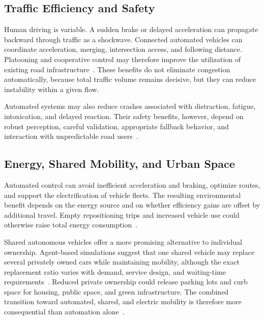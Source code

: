 \documentclass[12pt,a4paper]{article}
\begin{document}
\subsection{Traffic Efficiency and Safety}

Human driving is variable. A sudden brake or delayed acceleration can propagate backward through traffic as a shockwave. Connected automated vehicles can coordinate acceleration, merging, intersection access, and following distance. Platooning and cooperative control may therefore improve the utilization of existing road infrastructure~\citep{anderson2016}. These benefits do not eliminate congestion automatically, because total traffic volume remains decisive, but they can reduce instability within a given flow.

Automated systems may also reduce crashes associated with distraction, fatigue, intoxication, and delayed reaction. Their safety benefits, however, depend on robust perception, careful validation, appropriate fallback behavior, and interaction with unpredictable road users~\citep{fagnant2015}.

\subsection{Energy, Shared Mobility, and Urban Space}

Automated control can avoid inefficient acceleration and braking, optimize routes, and support the electrification of vehicle fleets. The resulting environmental benefit depends on the energy source and on whether efficiency gains are offset by additional travel. Empty repositioning trips and increased vehicle use could otherwise raise total energy consumption~\citep{milakis2017}.

Shared autonomous vehicles offer a more promising alternative to individual ownership. Agent-based simulations suggest that one shared vehicle may replace several privately owned cars while maintaining mobility, although the exact replacement ratio varies with demand, service design, and waiting-time requirements~\citep{fagnant2014}. Reduced private ownership could release parking lots and curb space for housing, public space, and green infrastructure. The combined transition toward automated, shared, and electric mobility is therefore more consequential than automation alone~\citep{sperling2018}.
\end{document}
